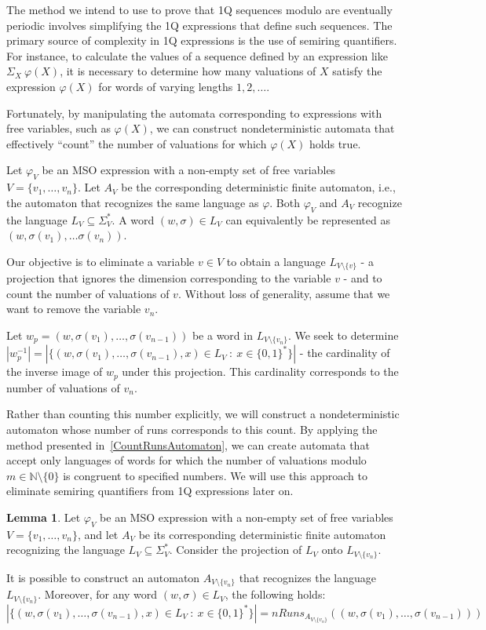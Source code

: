 \documentclass[en]{pracamgr}
\theoremstyle{definition}
\newtheorem{lemma}[theorem]{Lemma}
\begin{document}
The method we intend to use to prove that 1Q sequences modulo are eventually periodic involves simplifying the 1Q expressions that define such sequences. The primary source of complexity in 1Q expressions is the use of semiring quantifiers. For instance, to calculate the values of a sequence defined by an expression like $\Sigma_X \ \varphi(X)$, it is necessary to determine how many valuations of $X$ satisfy the expression $\varphi(X)$ for words of varying lengths $1,2,\ldots$.

Fortunately, by manipulating the automata corresponding to expressions with free variables, such as $\varphi(X)$, we can construct nondeterministic automata that effectively ``count'' the number of valuations for which $\varphi(X)$ holds true.

Let $\varphi_V$ be an MSO expression with a non-empty set of free variables $V = \{v_1, \ldots, v_n\}$. Let $A_V$ be the corresponding deterministic finite automaton, i.e., the automaton that recognizes the same language as $\varphi$. Both $\varphi_V$ and $A_V$ recognize the language $L_V \subseteq \Sigma_V^*$. A word $(w, \sigma) \in L_V$ can equivalently be represented as $(w, \sigma(v_1), \ldots \sigma(v_n))$.

Our objective is to eliminate a variable $v \in V$ to obtain a language $L_{V \setminus \{v\}}$ - a projection that ignores the dimension corresponding to the variable $v$ - and to count the number of valuations of $v$. Without loss of generality, assume that we want to remove the variable $v_n$.

Let $w_p = (w, \sigma(v_1), \ldots, \sigma(v_{n-1}))$ be a word in $L_{V \setminus \{v_n\}}$. We seek to determine $|w_p^{-1}| = |\{ (w, \sigma(v_1), \ldots, \sigma(v_{n-1}), x) \in L_V \ : \ x \in \{0,1\}^* \}|$ - the cardinality of the inverse image of $w_p$ under this projection. This cardinality corresponds to the number of valuations of $v_n$.

Rather than counting this number explicitly, we will construct a nondeterministic automaton whose number of runs corresponds to this count. By applying the method presented in~\cref{CountRunsAutomaton}, we can create automata that accept only languages of words for which the number of valuations modulo $m \in \mathbb{N} \setminus \{0\}$ is congruent to specified numbers. We will use this approach to eliminate semiring quantifiers from 1Q expressions later on.

\begin{lemma}
\label{LemElimVar}
    Let $\varphi_V$ be an MSO expression with a non-empty set of free variables $V = \{v_1, \ldots, v_n\}$, and let $A_V$ be its corresponding deterministic finite automaton recognizing the language $L_V \subseteq \Sigma_V^*$. Consider the projection of $L_V$ onto $L_{V \setminus \{v_n\}}$. 
    
    It is possible to construct an automaton $A_{V \setminus \{v_n\}}$ that recognizes the language $L_{V \setminus \{v_n\}}$. Moreover, for any word $(w, \sigma) \in L_V$, the following holds:
    $$|\{ (w, \sigma(v_1), \ldots, \sigma(v_{n-1}), x) \in L_V \ : \ x \in \{0,1\}^* \}| = nRuns_{A_{V \setminus \{v_n\}}}((w, \sigma(v_1), \ldots, \sigma(v_{n-1})))$$
\end{lemma}
\end{document}
